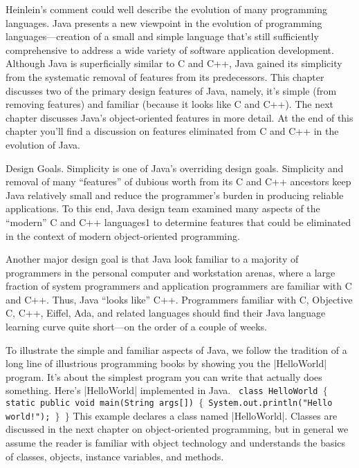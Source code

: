 Heinlein's comment could well describe the evolution of many programming
languages. Java presents a new viewpoint in the evolution of programming
languages---creation of a small and simple language that's still sufficiently
comprehensive to address a wide variety of software application development.
Although Java is superficially similar to C and C++, Java gained its simplicity
from the systematic removal of features from its predecessors. This chapter
discusses two of the primary design features of Java, namely, it's simple (from
removing features) and familiar (because it looks like C and C++). The next
chapter discusses Java's object-oriented features in more detail. At the end of
this chapter you'll find a discussion on features eliminated from C and C++ in
the evolution of Java.

\heading Design Goals.
Simplicity is one of Java's overriding design goals. Simplicity and removal of
many ``features'' of dubious worth from its C and C++ ancestors keep Java
relatively small and reduce the programmer's burden in producing reliable
applications. To this end, Java design team examined many aspects of the
``modern'' C and C++ languages1 to determine features that could be eliminated in
the context of modern object-oriented programming.

Another major design goal is that Java look familiar to a majority of
programmers in the personal computer and workstation arenas, where a large
fraction of system programmers and application programmers are familiar with C
and C++. Thus, Java ``looks like'' C++. Programmers familiar with C, Objective C,
C++, Eiffel, Ada, and related languages should find their Java language
learning curve quite short---on the order of a couple of weeks.

To illustrate the simple and familiar aspects of Java, we follow the tradition
of a long line of illustrious programming books by showing you the |HelloWorld|
program. It's about the simplest program you can write that actually does
something. Here's |HelloWorld| implemented in Java.
{\medbreak\narrower\obeylines\obeyspaces\tt
class HelloWorld $\{$
\hskip 0.3in static public void main(String args[]) $\{$
\hskip 0.6in    System.out.println("Hello world!");
\hskip 0.3in $\}$
$\}$\medbreak}
\noindent This example declares a class named |HelloWorld|. Classes are discussed
in the next chapter on object-oriented programming, but in general we assume
the reader is familiar with object technology and understands the basics of
classes, objects, instance variables, and methods.

